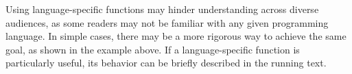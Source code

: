 

\goodbadexample{
    
}{
    
}

\noindent Using language-specific functions may hinder understanding across diverse audiences, as some readers may not be familiar with any given programming language.
In simple cases, there may be a more rigorous way to achieve the same goal, as shown in the example above.
If a language-specific function is particularly useful, its behavior can be briefly described in the running text.
